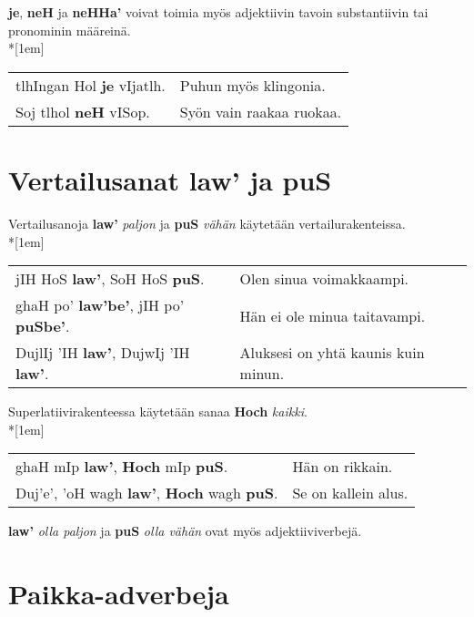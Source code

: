 \documentclass{book}
\begin{document}
\textbf{je}, \textbf{neH} ja \textbf{neHHa'} voivat toimia myös adjektiivin tavoin substantiivin tai pronominin määreinä.\\*[1em]
\begin{tabular}{l l}
    tlhIngan Hol \textbf{je} vIjatlh. & Puhun myös klingonia. \\
    Soj tlhol \textbf{neH} vISop. & Syön vain raakaa ruokaa. \\
\end{tabular}


\section{Vertailusanat law' ja puS}

Vertailusanoja \textbf{law'} \textit{paljon} ja \textbf{puS} \textit{vähän} käytetään vertailurakenteissa.
\\*[1em]
\begin{tabular}{l l}
    jIH HoS \textbf{law'}, SoH HoS \textbf{puS}. & Olen sinua voimakkaampi. \\
    ghaH po' \textbf{law'be'}, jIH po' \textbf{puSbe'}. & Hän ei ole minua taitavampi. \\
    DujlIj 'IH \textbf{law'}, DujwIj 'IH \textbf{law'}. & Aluksesi on yhtä kaunis kuin minun. \\
\end{tabular}

Superlatiivirakenteessa käytetään sanaa \textbf{Hoch} \textit{kaikki}.
\\*[1em]
\begin{tabular}{l l}
    ghaH mIp \textbf{law'}, \textbf{Hoch} mIp \textbf{puS}. & Hän on rikkain. \\
    Duj'e', 'oH wagh \textbf{law'}, \textbf{Hoch} wagh \textbf{puS}. & Se on kallein alus. \\
\end{tabular}

\textbf{law'} \textit{olla paljon} ja \textbf{puS} \textit{olla vähän} ovat myös adjektiiviverbejä.

\section{Paikka-adverbeja}
\end{document}

